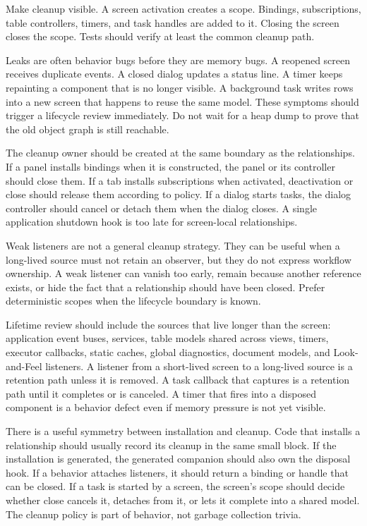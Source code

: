 Make cleanup visible. A screen activation creates a scope. Bindings, subscriptions, table controllers, timers, and task handles are added to it. Closing the screen closes the scope. Tests should verify at least the common cleanup path.

Leaks are often behavior bugs before they are memory bugs. A reopened screen
receives duplicate events. A closed dialog updates a status line. A timer keeps
repainting a component that is no longer visible. A background task writes rows
into a new screen that happens to reuse the same model. These symptoms should
trigger a lifecycle review immediately. Do not wait for a heap dump to prove
that the old object graph is still reachable.

The cleanup owner should be created at the same boundary as the relationships.
If a panel installs bindings when it is constructed, the panel or its controller
should close them. If a tab installs subscriptions when activated, deactivation
or close should release them according to policy. If a dialog starts tasks, the
dialog controller should cancel or detach them when the dialog closes. A single
application shutdown hook is too late for screen-local relationships.

Weak listeners are not a general cleanup strategy. They can be useful when a
long-lived source must not retain an observer, but they do not express workflow
ownership. A weak listener can vanish too early, remain because another
reference exists, or hide the fact that a relationship should have been closed.
Prefer deterministic scopes when the lifecycle boundary is known.

Lifetime review should include the sources that live longer than the screen:
application event buses, services, table models shared across views, timers,
executor callbacks, static caches, global diagnostics, document models, and
Look-and-Feel listeners. A listener from a short-lived screen to a long-lived
source is a retention path unless it is removed. A task callback that captures
 is a retention path until it completes or is canceled. A timer that
fires into a disposed component is a behavior defect even if memory pressure is
not yet visible.

There is a useful symmetry between installation and cleanup. Code that installs
a relationship should usually record its cleanup in the same small block. If
the installation is generated, the generated companion should also own the
disposal hook. If a behavior attaches listeners, it should return a binding or
handle that can be closed. If a task is started by a screen, the screen's scope
should decide whether close cancels it, detaches from it, or lets it complete
into a shared model. The cleanup policy is part of behavior, not garbage
collection trivia.

